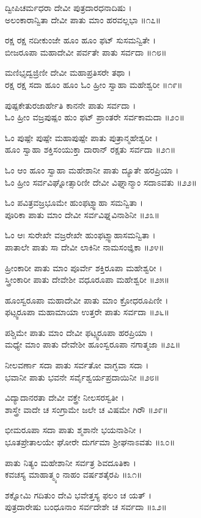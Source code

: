 ದ್ವೀಪಿಚರ್ಮಧರಾ ದೇವೀ ಪುತ್ರದಾರಧನಾದಿಷು ।\\
ಅಲಂಕಾರಾನ್ವಿತಾ ದೇವೀ ಪಾತು ಮಾಂ ಹರವಲ್ಲಭಾ ॥೧೭॥

ರಕ್ಷ ರಕ್ಷ ನದೀಕುಂಜೇ ಹೂಂ ಹೂಂ ಫಟ್ ಸುಸಮನ್ವಿತೇ ।\\
ಬೀಜರೂಪಾ ಮಹಾದೇವೀ ಪರ್ವತೇ ಪಾತು ಸರ್ವದಾ ॥೧೮॥

ಮಣಿಭೃದ್ವಜ್ರಿಣೀ ದೇವೀ ಮಹಾಪ್ರತಿಸರೇ ತಥಾ ।\\
ರಕ್ಷ ರಕ್ಷ ಸದಾ ಹೂಂ ಹೂಂ ಓಂ ಹ್ರೀಂ ಸ್ವಾಹಾ ಮಹೇಶ್ವರೀ ॥೧೯॥

ಪುಷ್ಪಕೇತುರಜಾರ್ಹೇತಿ ಕಾನನೇ ಪಾತು ಸರ್ವದಾ ।\\
ಓಂ ಹ್ರೀಂ ವಜ್ರಪುಷ್ಪಂ ಹುಂ ಫಟ್ ಪ್ರಾಂತರೇ ಸರ್ವಕಾಮದಾ ॥೨೦॥

ಓಂ ಪುಷ್ಪೇ ಪುಷ್ಪೇ ಮಹಾಪುಷ್ಪೇ ಪಾತು ಪುತ್ರಾನ್ಮಹೇಶ್ವರೀ ।\\
ಹೂಂ ಸ್ವಾಹಾ ಶಕ್ತಿಸಂಯುಕ್ತಾ ದಾರಾನ್ ರಕ್ಷತು ಸರ್ವದಾ ॥೨೧॥

ಓಂ ಆಂ ಹೂಂ ಸ್ವಾಹಾ ಮಹೇಶಾನೀ ಪಾತು ದ್ಯೂತೇ ಹರಪ್ರಿಯಾ ।\\
ಓಂ ಹ್ರೀಂ ಸರ್ವವಿಘ್ನೋತ್ಸಾರಿಣೀ ದೇವೀ ವಿಘ್ನಾನ್ಮಾಂ ಸದಾಽವತು ॥೨೨॥

ಓಂ ಪವಿತ್ರವಜ್ರಭೂಮೇ ಹುಂಫಟ್ಸ್ವಾಹಾ ಸಮನ್ವಿತಾ ।\\
ಪೂರಿಕಾ ಪಾತು ಮಾಂ ದೇವೀ ಸರ್ವವಿಘ್ನವಿನಾಶಿನೀ ॥೨೩॥

ಓಂ ಆಃ ಸುರೇಖೇ ವಜ್ರರೇಖೇ ಹುಂಫಟ್ಸ್ವಾಹಾಸಮನ್ವಿತಾ ।\\
ಪಾತಾಲೇ ಪಾತು ಸಾ ದೇವೀ ಲಾಕಿನೀ ನಾಮಸಂಜ್ಞಿಕಾ ॥೨೪॥

ಹ್ರೀಂಕಾರೀ ಪಾತು ಮಾಂ ಪೂರ್ವೇ ಶಕ್ತಿರೂಪಾ ಮಹೇಶ್ವರೀ ।\\
ಸ್ತ್ರೀಂಕಾರೀ ಪಾತು ದೇವೇಶೀ ವಧೂರೂಪಾ ಮಹೇಶ್ವರೀ ॥೨೫॥

ಹೂಂಸ್ವರೂಪಾ ಮಹಾದೇವೀ ಪಾತು ಮಾಂ ಕ್ರೋಧರೂಪಿಣೀ ।\\
ಫಟ್ಸ್ವರೂಪಾ ಮಹಾಮಾಯಾ ಉತ್ತರೇ ಪಾತು ಸರ್ವದಾ ॥೨೬॥

ಪಶ್ಚಿಮೇ ಪಾತು ಮಾಂ ದೇವೀ ಫಟ್ಸ್ವರೂಪಾ ಹರಪ್ರಿಯಾ ।\\
ಮಧ್ಯೇ ಮಾಂ ಪಾತು ದೇವೇಶೀ ಹೂಂಸ್ವರೂಪಾ ನಗಾತ್ಮಜಾ ॥೨೭॥

ನೀಲವರ್ಣಾ ಸದಾ ಪಾತು ಸರ್ವತೋ ವಾಗ್ಭವಾ ಸದಾ ।\\
ಭವಾನೀ ಪಾತು ಭವನೇ ಸರ್ವೈಶ್ವರ್ಯಪ್ರದಾಯಿನೀ ॥೨೮॥

ವಿದ್ಯಾದಾನರತಾ ದೇವೀ ವಕ್ತ್ರೇ ನೀಲಸರಸ್ವತೀ ।\\
ಶಾಸ್ತ್ರೇ ವಾದೇ ಚ ಸಂಗ್ರಾಮೇ ಜಲೇ ಚ ವಿಷಮೇ ಗಿರೌ ॥೨೯॥

ಭೀಮರೂಪಾ ಸದಾ ಪಾತು ಶ್ಮಶಾನೇ ಭಯನಾಶಿನೀ ।\\
ಭೂತಪ್ರೇತಾಲಯೇ ಘೋರೇ ದುರ್ಗಮಾ ಶ್ರೀಘನಾಽವತು ॥೩೦॥

ಪಾತು ನಿತ್ಯಂ ಮಹೇಶಾನೀ ಸರ್ವತ್ರ ಶಿವದೂತಿಕಾ ।\\
ಕವಚಸ್ಯ ಮಾಹಾತ್ಮ್ಯಂ ನಾಹಂ ವರ್ಷಶತೈರಪಿ ॥೩೧॥

ಶಕ್ನೋಮಿ ಗದಿತುಂ ದೇವಿ ಭವೇತ್ತಸ್ಯ ಫಲಂ ಚ ಯತ್ ।\\
ಪುತ್ರದಾರೇಷು ಬಂಧೂನಾಂ ಸರ್ವದೇಶೇ ಚ ಸರ್ವದಾ ॥೩೨॥


